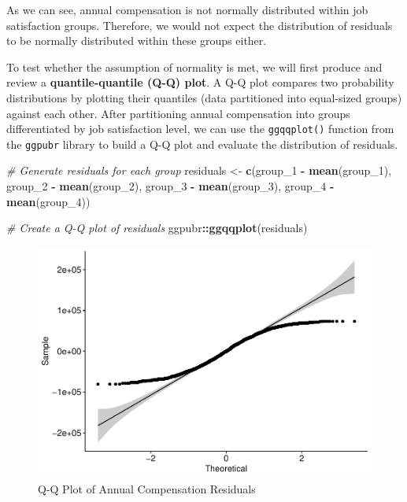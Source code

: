 \documentclass[]{book}
\newenvironment{Shaded}{\begin{snugshade}}{\end{snugshade}}
\newcommand{\CommentTok}[1]{\textcolor[rgb]{0.56,0.35,0.01}{\textit{#1}}}
\newcommand{\DecValTok}[1]{\textcolor[rgb]{0.00,0.00,0.81}{#1}}
\newcommand{\KeywordTok}[1]{\textcolor[rgb]{0.13,0.29,0.53}{\textbf{#1}}}
\newcommand{\NormalTok}[1]{#1}
\newcommand{\OperatorTok}[1]{\textcolor[rgb]{0.81,0.36,0.00}{\textbf{#1}}}
\newcommand{\StringTok}[1]{\textcolor[rgb]{0.31,0.60,0.02}{#1}}
\begin{document}
As we can see, annual compensation is not normally distributed within job satisfaction groups. Therefore, we would not expect the distribution of residuals to be normally distributed within these groups either.

To test whether the assumption of normality is met, we will first produce and review a \textbf{quantile-quantile (Q-Q) plot}. A Q-Q plot compares two probability distributions by plotting their quantiles (data partitioned into equal-sized groups) against each other. After partitioning annual compensation into groups differentiated by job satisfaction level, we can use the \texttt{ggqqplot()} function from the \texttt{ggpubr} library to build a Q-Q plot and evaluate the distribution of residuals.

\begin{Shaded}
\begin{Highlighting}[]
\CommentTok{# Generate residuals for each group}
\NormalTok{residuals <-}\StringTok{ }\KeywordTok{c}\NormalTok{(group_}\DecValTok{1} \OperatorTok{-}\StringTok{ }\KeywordTok{mean}\NormalTok{(group_}\DecValTok{1}\NormalTok{), group_}\DecValTok{2} \OperatorTok{-}\StringTok{ }\KeywordTok{mean}\NormalTok{(group_}\DecValTok{2}\NormalTok{), group_}\DecValTok{3} \OperatorTok{-}\StringTok{ }\KeywordTok{mean}\NormalTok{(group_}\DecValTok{3}\NormalTok{), group_}\DecValTok{4} \OperatorTok{-}\StringTok{ }\KeywordTok{mean}\NormalTok{(group_}\DecValTok{4}\NormalTok{))}

\CommentTok{# Create a Q-Q plot of residuals}
\NormalTok{ggpubr}\OperatorTok{::}\KeywordTok{ggqqplot}\NormalTok{(residuals)}
\end{Highlighting}
\end{Shaded}

\begin{figure}

{\centering \includegraphics{People_Analytics_Lifecycle_files/figure-latex/qq-plot-1} 

}

\caption{Q-Q Plot of Annual Compensation Residuals}\label{fig:qq-plot}
\end{figure}
\end{document}

